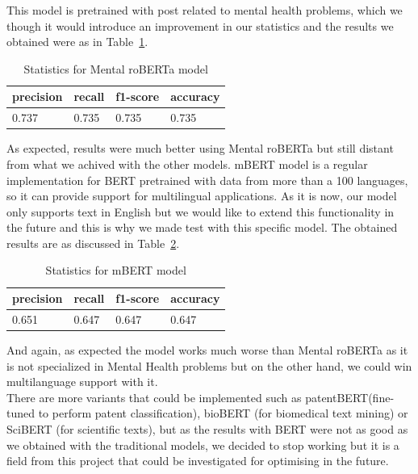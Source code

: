This model is pretrained with post related to mental health problems, which we though it would introduce an improvement in our statistics and the results we obtained were as in Table~\ref{tab:MentalroBERTastatistics}.
\begin{table}[!htp]
\centering
\begin{tabular}{|l|l|l|l|}
\hline
precision & recall & f1-score  & accuracy \\ \hline
0.737      & 0.735   &  0.735      &  0.735 \\ \hline
\end{tabular}
\caption{Statistics for Mental roBERTa model}
\label{tab:MentalroBERTastatistics}
\end{table}

As expected, results were much better using Mental roBERTa but still distant from what we achived with the other models.
mBERT model is a regular implementation for BERT pretrained with data from more than a 100 languages, so it can provide support for multilingual applications. As it is now, our model only supports text in English but we would like to extend this functionality in the future and this is why we made test with this specific model. The obtained results are as discussed in Table~\ref{tab:mBERTstatistics}.
\begin{table}[!htp]
\centering
\begin{tabular}{|l|l|l|l|}
\hline
precision & recall & f1-score  & accuracy \\ \hline
0.651      & 0.647   & 0.647      &  0.647 \\ \hline
\end{tabular}
\caption{Statistics for mBERT model}
\label{tab:mBERTstatistics}
\end{table}

And again, as expected the model works much worse than Mental roBERTa as it is not specialized in Mental Health problems but on the other hand, we could win multilanguage support with it. \\

There are more variants that could be implemented such as patentBERT(fine-tuned to perform patent classification), bioBERT (for biomedical text mining) or SciBERT (for scientific texts), but as the results with BERT were not as good as we obtained with the traditional models, we decided to stop working but it is a field from this project that could be investigated for optimising in the future.



